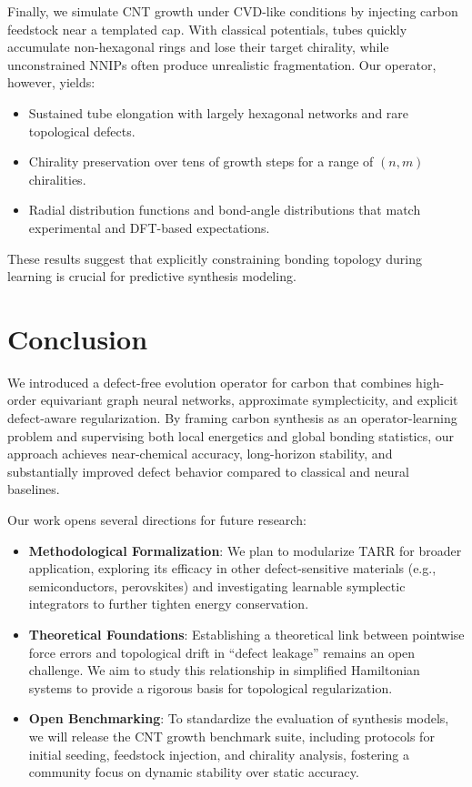 \documentclass{article}
\begin{document}
Finally, we simulate CNT growth under CVD-like conditions by injecting carbon feedstock near a templated cap. With classical potentials, tubes quickly accumulate non-hexagonal rings and lose their target chirality, while unconstrained NNIPs often produce unrealistic fragmentation. Our operator, however, yields:
\begin{itemize}
    \item Sustained tube elongation with largely hexagonal networks and rare topological defects.
    \item Chirality preservation over tens of growth steps for a range of $(n,m)$ chiralities.
    \item Radial distribution functions and bond-angle distributions that match experimental and DFT-based expectations.
\end{itemize}

These results suggest that explicitly constraining bonding topology during learning is crucial for predictive synthesis modeling.

\section{Conclusion}
\label{sec:conclusion}

We introduced a defect-free evolution operator for carbon that combines high-order equivariant graph neural networks, approximate symplecticity, and explicit defect-aware regularization. By framing carbon synthesis as an operator-learning problem and supervising both local energetics and global bonding statistics, our approach achieves near-chemical accuracy, long-horizon stability, and substantially improved defect behavior compared to classical and neural baselines.

Our work opens several directions for future research:
\begin{itemize}
    \item \textbf{Methodological Formalization}: We plan to modularize TARR for broader application, exploring its efficacy in other defect-sensitive materials (e.g., semiconductors, perovskites) and investigating learnable symplectic integrators to further tighten energy conservation.
    \item \textbf{Theoretical Foundations}: Establishing a theoretical link between pointwise force errors and topological drift in ``defect leakage'' remains an open challenge. We aim to study this relationship in simplified Hamiltonian systems to provide a rigorous basis for topological regularization.
    \item \textbf{Open Benchmarking}: To standardize the evaluation of synthesis models, we will release the CNT growth benchmark suite, including protocols for initial seeding, feedstock injection, and chirality analysis, fostering a community focus on dynamic stability over static accuracy.
\end{itemize}
\end{document}
